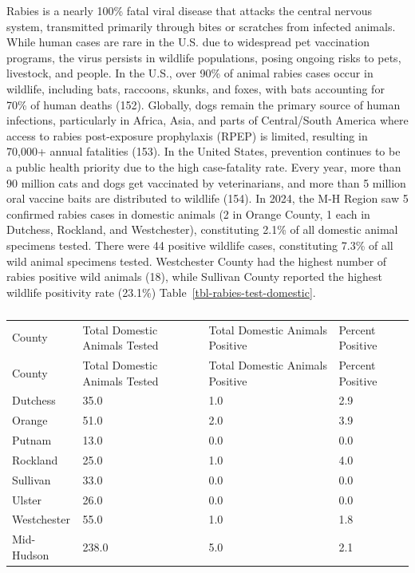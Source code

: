 \documentclass[
  english,
  letterpaper,
]{report}
\begin{document}
Rabies is a nearly 100\% fatal viral disease that attacks the central
nervous system, transmitted primarily through bites or scratches from
infected animals. While human cases are rare in the U.S. due to
widespread pet vaccination programs, the virus persists in wildlife
populations, posing ongoing risks to pets, livestock, and people. In the
U.S., over 90\% of animal rabies cases occur in wildlife, including
bats, raccoons, skunks, and foxes, with bats accounting for 70\% of
human deaths (152). Globally, dogs remain the primary source of human
infections, particularly in Africa, Asia, and parts of Central/South
America where access to rabies post-exposure prophylaxis (RPEP) is
limited, resulting in 70,000+ annual fatalities (153). In the United
States, prevention continues to be a public health priority due to the
high case-fatality rate. Every year, more than 90 million cats and dogs
get vaccinated by veterinarians, and more than 5 million oral vaccine
baits are distributed to wildlife (154). In 2024, the M-H Region saw 5
confirmed rabies cases in domestic animals (2 in Orange County, 1 each
in Dutchess, Rockland, and Westchester), constituting 2.1\% of all
domestic animal specimens tested. There were 44 positive wildlife cases,
constituting 7.3\% of all wild animal specimens tested. Westchester
County had the highest number of rabies positive wild animals (18),
while Sullivan County reported the highest wildlife positivity rate
(23.1\%) Table~\ref{tbl-rabies-test-domestic}.

\begin{longtable}[]{@{}llll@{}}

\caption{\label{tbl-rabies-test-domestic}Animal Rabies Testing of
Domestic Species†, 2024}

\tabularnewline

\caption{}\label{T_00ebe}\tabularnewline
\toprule\noalign{}
County & Total Domestic Animals Tested & Total Domestic Animals Positive
& Percent Positive \\
\midrule\noalign{}
\endfirsthead
\toprule\noalign{}
County & Total Domestic Animals Tested & Total Domestic Animals Positive
& Percent Positive \\
\midrule\noalign{}
\endhead
\bottomrule\noalign{}
\endlastfoot
Dutchess & 35.0 & 1.0 & 2.9 \\
Orange & 51.0 & 2.0 & 3.9 \\
Putnam & 13.0 & 0.0 & 0.0 \\
Rockland & 25.0 & 1.0 & 4.0 \\
Sullivan & 33.0 & 0.0 & 0.0 \\
Ulster & 26.0 & 0.0 & 0.0 \\
Westchester & 55.0 & 1.0 & 1.8 \\
Mid-Hudson & 238.0 & 5.0 & 2.1 \\

\end{longtable}
\end{document}
